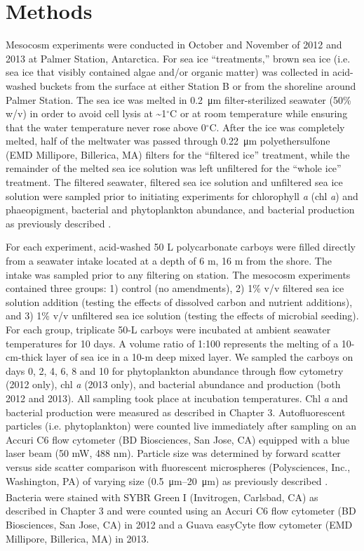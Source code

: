 \section{Methods}

Mesocosm experiments were conducted in October and November of 2012 and 2013 at Palmer Station, Antarctica. For sea ice ``treatments,'' brown sea ice (i.e. sea ice that visibly contained algae and/or organic matter) was collected in acid-washed buckets from the surface at either Station B or from the shoreline around Palmer Station. The sea ice was melted in \SI{0.2}{\micro\meter} filter-sterilized seawater (50\% w/v) in order to avoid cell lysis at \textasciitilde{}1$^{\circ}$C or at room temperature while ensuring that the water temperature never rose above 0$^{\circ}$C. After the ice was completely melted, half of the meltwater was passed through \SI{0.22}{\micro\meter} polyethersulfone (EMD Millipore, Billerica, MA) filters for the ``filtered ice'' treatment, while the remainder of the melted sea ice solution was left unfiltered for the ``whole ice'' treatment. The filtered seawater, filtered sea ice solution and unfiltered sea ice solution were sampled prior to initiating experiments for chlorophyll \emph{a} (chl \emph{a}) and phaeopigment, bacterial and phytoplankton abundance, and bacterial production as previously described \citep{Luria2014-dj}.

For each experiment, acid-washed 50 L polycarbonate carboys were filled directly from a seawater intake located at a depth of 6 m, 16 m from the shore. The intake was sampled prior to any filtering on station. The mesocosm experiments contained three groups: 1) control (no amendments), 2) 1\% v/v filtered sea ice solution addition (testing the effects of dissolved carbon and nutrient additions), and 3) 1\% v/v unfiltered sea ice solution (testing the effects of microbial seeding). For each group, triplicate 50-L carboys were incubated at ambient seawater temperatures for 10 days. A volume ratio of 1:100 represents the melting of a 10-cm-thick layer of sea ice in a 10-m deep mixed layer. We sampled the carboys on days 0, 2, 4, 6, 8 and 10 for phytoplankton abundance through flow cytometry (2012 only), chl \emph{a} (2013 only), and bacterial abundance and production (both 2012 and 2013). All sampling took place at incubation temperatures. Chl \emph{a} and bacterial production were measured as described in Chapter 3. Autofluorescent particles (i.e. phytoplankton) were counted live immediately after sampling on an Accuri C6 flow cytometer (BD Biosciences, San Jose, CA) equipped with a blue laser beam (50 mW, 488 nm). Particle size was determined by forward scatter versus side scatter comparison with fluorescent microspheres (Polysciences, Inc., Washington, PA) of varying size (\SIrange{0.5}{20}{\micro\meter}) as previously described \citep{garzio2013microzooplankton}. Bacteria were stained with SYBR\textsuperscript{\textregistered} Green I (Invitrogen, Carlsbad, CA) as described in Chapter 3 and were counted using an Accuri C6 flow cytometer (BD Biosciences, San Jose, CA) in 2012 and a Guava easyCyte flow cytometer (EMD Millipore, Billerica, MA) in 2013. 

